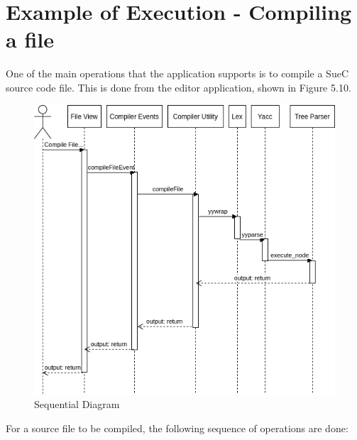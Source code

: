 \documentclass[12pt,a4paper,twoside]{report}
\begin{document}
\section{Example of Execution - Compiling a file}
One of the main operations that the application supports is to compile a SueC source code file. This is done from the editor application, shown in Figure 5.10.
\begin{figure}[H]
    \centering
    \includegraphics[width=0.52\linewidth]{img/SeqDiag.png}
    \caption{Sequential Diagram}
    \label{fig:conf}
\end{figure}

For a source file to be compiled, the following sequence of operations are done:
\end{document}
